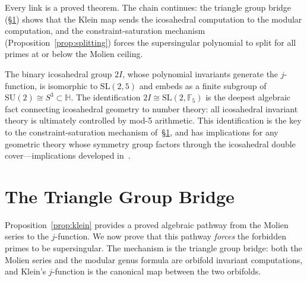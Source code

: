 \documentclass[11pt,letterpaper]{article}
\theoremstyle{definition}
\newcommand{\HH}{\mathbb{H}}
\newcommand{\FF}{\mathbb{F}}
\begin{document}
Every link is a proved theorem.  The chain continues: the triangle group bridge (\S\ref{sec:bridge}) shows that the Klein map sends the icosahedral computation to the modular computation, and the constraint-saturation mechanism (Proposition~\ref{prop:splitting}) forces the supersingular polynomial to split for all primes at or below the Molien ceiling.
\begin{remarkbox}
The binary icosahedral group $2I$, whose polynomial invariants generate the $j$-function, is isomorphic to $\mathrm{SL}(2,5)$ and embeds as a finite subgroup of $\mathrm{SU}(2)\cong S^3\subset\HH$.  The identification $2I\cong\mathrm{SL}(2,\FF_5)$ is the deepest algebraic fact connecting icosahedral geometry to number theory: all icosahedral invariant theory is ultimately controlled by mod-5 arithmetic.  This identification is the key to the constraint-saturation mechanism of~\S\ref{sec:bridge}, and has implications for any geometric theory whose symmetry group factors through the icosahedral double cover---implications developed in~\cite{Meucci2026loop,Meucci2025pauli,Meucci2025su3}.
\end{remarkbox}
\section{The Triangle Group Bridge}\label{sec:bridge}
Proposition~\ref{prop:klein} provides a proved algebraic pathway from the Molien series to the $j$-function.  We now prove that this pathway \emph{forces} the forbidden primes to be supersingular.  The mechanism is the triangle group bridge: both the Molien series and the modular genus formula are orbifold invariant computations, and Klein's $j$-function is the canonical map between the two orbifolds.
\end{document}
